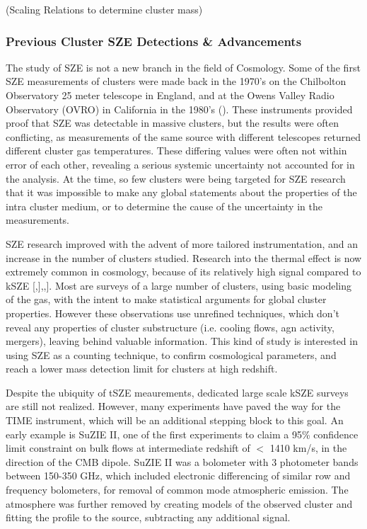 \documentclass[manuscript]{aastex}
\begin{document}
(Scaling Relations to determine cluster mass) 


\subsubsection{Previous Cluster SZE Detections \& Advancements}

The study of SZE is not a new branch in the field of Cosmology. Some of the first SZE measurements of clusters were made back in the 1970's on the Chilbolton Observatory 25 meter telescope in England, and at the Owens Valley Radio Observatory (OVRO) in California in the 1980's (\cite{Birkinshaw1999}). These instruments provided proof that SZE was detectable in massive clusters, but the results were often conflicting, as measurements of the same source with different telescopes returned different cluster gas temperatures. These differing values were often not within error of each other, revealing a serious systemic uncertainty not accounted for in the analysis. At the time, so few clusters were being targeted for SZE research that it was impossible to make any global statements about the properties of the intra cluster medium, or to determine the cause of the uncertainty in the measurements. 

SZE research improved with the advent of more tailored instrumentation, and an increase in the number of clusters studied. Research into the thermal effect is now extremely common in cosmology, because of its relatively high signal compared to kSZE [\cite{Benson2013},\cite{Saliwanchik2015}],\cite{Bleem2015},\cite{Planck2016}]. Most are surveys of a large number of clusters, using basic modeling of the gas, with the intent to make statistical arguments for global cluster properties. However these observations use unrefined techniques, which don't reveal any properties of cluster substructure (i.e. cooling flows, agn activity, mergers), leaving behind valuable information. This kind of study is interested in using SZE as a counting technique, to confirm cosmological parameters, and reach a lower mass detection limit for clusters at high redshift. 

Despite the ubiquity of tSZE meaurements, dedicated large scale kSZE surveys are still not realized. However, many experiments have paved the way for the TIME instrument, which will be an additional stepping block to this goal. An early example is SuZIE II, one of the first experiments to claim a 95\% confidence limit constraint on bulk flows at intermediate redshift of \(<\) 1410 km/s, in the direction of the CMB dipole. SuZIE II was a bolometer with 3 photometer bands between 150-350 GHz, which included electronic differencing of similar row and frequency bolometers, for removal of common mode atmospheric emission. The atmosphere was further removed by creating models of the observed cluster and fitting the profile to the source, subtracting any additional signal. 
\end{document}
